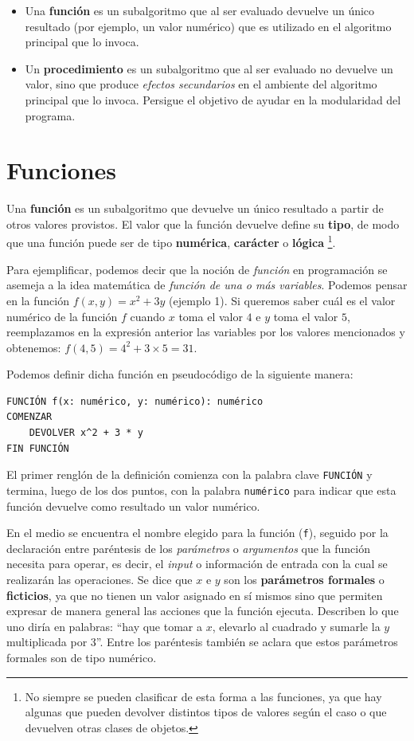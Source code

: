 \documentclass[
]{book}
\providecommand{\tightlist}{%
  \setlength{\itemsep}{0pt}\setlength{\parskip}{0pt}}
\begin{document}
\begin{itemize}
\tightlist
\item
  Una \textbf{función} es un subalgoritmo que al ser evaluado devuelve un único resultado (por ejemplo, un valor numérico) que es utilizado en el algoritmo principal que lo invoca.
\item
  Un \textbf{procedimiento} es un subalgoritmo que al ser evaluado no devuelve un valor, sino que produce \emph{efectos secundarios} en el ambiente del algoritmo principal que lo invoca. Persigue el objetivo de ayudar en la modularidad del programa.
\end{itemize}

\hypertarget{funciones}{%
\section{Funciones}\label{funciones}}

Una \textbf{función} es un subalgoritmo que devuelve un único resultado a partir de otros valores provistos. El valor que la función devuelve define su \textbf{tipo}, de modo que una función puede ser de tipo \textbf{numérica}, \textbf{carácter} o \textbf{lógica} \footnote{No siempre se pueden clasificar de esta forma a las funciones, ya que hay algunas que pueden devolver distintos tipos de valores según el caso o que devuelven otras clases de objetos.}.

Para ejemplificar, podemos decir que la noción de \emph{función} en programación se asemeja a la idea matemática de \emph{función de una o más variables}. Podemos pensar en la función \(f(x, y) = x^2 + 3y\) (ejemplo 1). Si queremos saber cuál es el valor numérico de la función \(f\) cuando \(x\) toma el valor \(4\) e \(y\) toma el valor \(5\), reemplazamos en la expresión anterior las variables por los valores mencionados y obtenemos: \(f(4, 5) = 4^2 + 3 \times 5 = 31\).

Podemos definir dicha función en pseudocódigo de la siguiente manera:

\begin{verbatim}
FUNCIÓN f(x: numérico, y: numérico): numérico
COMENZAR
    DEVOLVER x^2 + 3 * y
FIN FUNCIÓN
\end{verbatim}

El primer renglón de la definición comienza con la palabra clave \texttt{FUNCIÓN} y termina, luego de los dos puntos, con la palabra \texttt{numérico} para indicar que esta función devuelve como resultado un valor numérico.

En el medio se encuentra el nombre elegido para la función (\texttt{f}), seguido por la declaración entre paréntesis de los \emph{parámetros} o \emph{argumentos} que la función necesita para operar, es decir, el \emph{input} o información de entrada con la cual se realizarán las operaciones. Se dice que \(x\) e \(y\) son los \textbf{parámetros formales} o \textbf{ficticios}, ya que no tienen un valor asignado en sí mismos sino que permiten expresar de manera general las acciones que la función ejecuta. Describen lo que uno diría en palabras: ``hay que tomar a \(x\), elevarlo al cuadrado y sumarle la \(y\) multiplicada por 3''. Entre los paréntesis también se aclara que estos parámetros formales son de tipo numérico.
\end{document}
